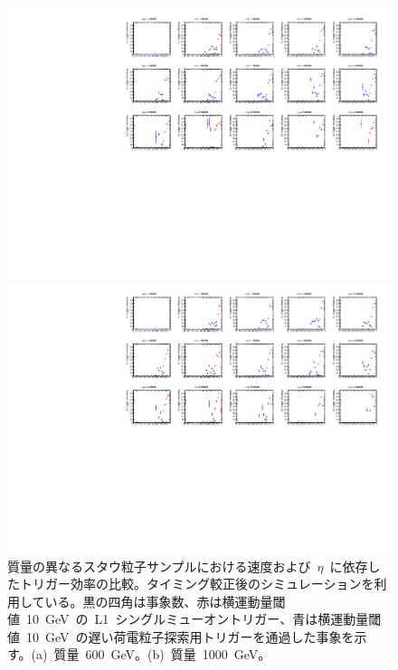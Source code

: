 \begin{figure}[H]
    \begin{minipage}{0.49\hsize}
    \centering   
    \includegraphics[width=\textwidth,page=16]{img/rec/stau_600.pdf}
    \subcaption{}
    \end{minipage}
    \begin{minipage}{0.49\hsize}
    \centering   
    \includegraphics[width=\textwidth,page=16]{img/rec/stau_1000.pdf}
    \subcaption{}
    \end{minipage}
    \caption[質量の異なるスタウ粒子サンプルにおける速度および~$\eta$~に依存したトリガー効率の比較]{質量の異なるスタウ粒子サンプルにおける速度および~$\eta$~に依存したトリガー効率の比較。タイミング較正後のシミュレーションを利用している。黒の四角は事象数、赤は横運動量閾値~10~GeV~の~L1~シングルミューオントリガー、青は横運動量閾値~10~GeV~の遅い荷電粒子探索用トリガーを通過した事象を示す。(a)~質量~600~GeV。(b)~質量~1000~GeV。}\label{fig:trietabeta6}
\end{figure}
